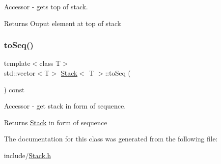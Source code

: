 Accessor -\/ gets top of stack. 

\begin{DoxyReturn}{Returns}
Ouput element at top of stack 
\end{DoxyReturn}
\mbox{\label{class_stack_af96a1f465756ae90dec75ae76e1d301d}} 
\subsubsection{\texorpdfstring{to\+Seq()}{toSeq()}}
{\footnotesize\ttfamily template$<$class T$>$ \\
std\+::vector$<$T$>$ \hyperlink{class_stack}{Stack}$<$ T $>$\+::to\+Seq (\begin{DoxyParamCaption}{ }\end{DoxyParamCaption}) const}



Accessor -\/ get stack in form of sequence. 

\begin{DoxyReturn}{Returns}
\hyperlink{class_stack}{Stack} in form of sequence 
\end{DoxyReturn}


The documentation for this class was generated from the following file\+:\begin{DoxyCompactItemize}
\item 
include/\hyperlink{_stack_8h}{Stack.\+h}\end{DoxyCompactItemize}
